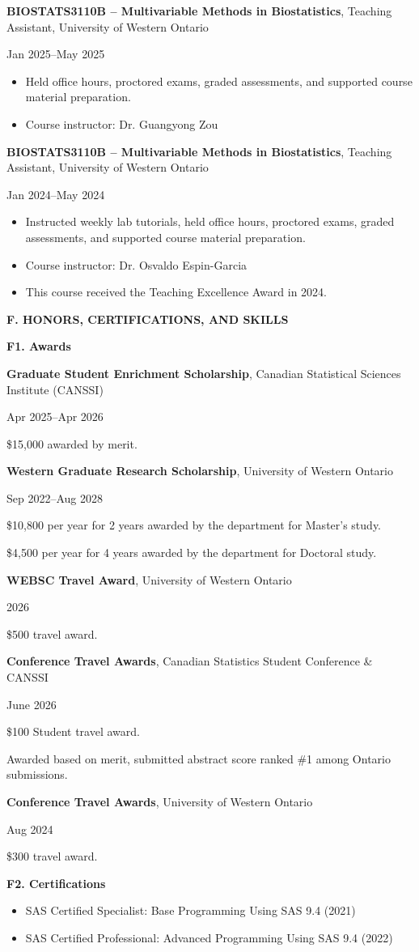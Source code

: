 \documentclass[10pt]{article}
\newcommand{\cvsection}[1]{%
  \Needspace{5\baselineskip}%
  \vspace{0.65em}%
  {\large\bfseries\color{sectiongray} #1}\par
  \vspace{0.18em}%
}
\newcommand{\cvsubsection}[1]{%
  \Needspace{4\baselineskip}%
  \vspace{0.3em}%
  {\bfseries #1}\par
}
\newcommand{\cvdated}[2]{%
  \noindent
  \begin{minipage}[t]{\dimexpr\linewidth-1.35in\relax}
    \raggedright\strut #1\strut
  \end{minipage}%
  \hfill
  \begin{minipage}[t]{1.18in}
    \raggedleft\strut{\color{dategray} #2}%
  \end{minipage}\par
}
\newcommand{\cvteachingentry}[2]{%
  \Needspace{7\baselineskip}%
  \cvdated{#1}{#2}%
}
\newcommand{\cvaward}[4]{%
  \cvdated{\textbf{#1}, #2}{#3}%
  \vspace{-0.06em}%
  \hspace*{1.1em}\parbox[t]{\dimexpr\linewidth-1.1em\relax}{#4}\par
}
\newcommand{\cvawarddetail}[1]{%
  \vspace{0.02em}%
  \hspace*{1.1em}\parbox[t]{\dimexpr\linewidth-1.1em\relax}{#1}\par
}
\begin{document}
\cvteachingentry{\textbf{BIOSTATS3110B -- Multivariable Methods in Biostatistics}, Teaching Assistant, University of Western Ontario}{Jan 2025--May 2025}
\begin{itemize}[leftmargin=1.6em,label=--]
\item Held office hours, proctored exams, graded assessments, and supported course material preparation.
\item Course instructor: Dr. Guangyong Zou
\end{itemize}

\cvteachingentry{\textbf{BIOSTATS3110B -- Multivariable Methods in Biostatistics}, Teaching Assistant, University of Western Ontario}{Jan 2024--May 2024}
\begin{itemize}[leftmargin=1.6em,label=--]
\item Instructed weekly lab tutorials, held office hours, proctored exams, graded assessments, and supported course material preparation.
\item Course instructor: Dr. Osvaldo Espin-Garcia
\item This course received the Teaching Excellence Award in 2024.
\end{itemize}

\cvsection{F. HONORS, CERTIFICATIONS, AND SKILLS}

\cvsubsection{F1. Awards}
\cvaward{Graduate Student Enrichment Scholarship}{Canadian Statistical Sciences Institute (CANSSI)}{Apr 2025--Apr 2026}{\$15,000 awarded by merit.}

\cvaward{Western Graduate Research Scholarship}{University of Western Ontario}{Sep 2022--Aug 2028}{\$10,800 per year for 2 years awarded by the department for Master's study.}
\cvawarddetail{\$4,500 per year for 4 years awarded by the department for Doctoral study.}

\cvaward{WEBSC Travel Award}{University of Western Ontario}{2026}{\$500 travel award.}

\cvaward{Conference Travel Awards}{Canadian Statistics Student Conference \& CANSSI}{June 2026}{\$100 Student travel award.}
\cvawarddetail{Awarded based on merit, submitted abstract score ranked \#1 among Ontario submissions.}


\cvaward{Conference Travel Awards}{University of Western Ontario}{Aug 2024}{\$300 travel award.}

\cvsubsection{F2. Certifications}
\begin{itemize}[leftmargin=1.6em,label=--]
\item SAS Certified Specialist: Base Programming Using SAS 9.4 (2021)
\item SAS Certified Professional: Advanced Programming Using SAS 9.4 (2022)
\end{itemize}
\end{document}

